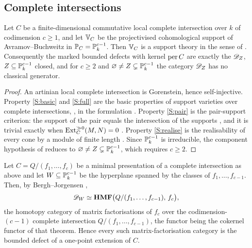 \subsection{Complete intersections}

\begin{theorem}\label{thm:ci-classification}
Let \(C\) be a finite-dimensional commutative local complete intersection over \(k\) of codimension \(c\ge1\), and let \(\mathbb V_C\) be the projectivised cohomological support of Avramov--Buchweitz \cite{AvramovBuchweitz00} in \(\mathbb P_C=\mathbb P^{c-1}_k\).  Then \(\mathbb V_C\) is a support theory in the sense of .  Consequently the marked bounded defects with kernel \(\operatorname{per} C\) are exactly the \(\mathscr D_Z\), \(Z\subseteq\mathbb P^{c-1}_k\) closed, and for \(c\ge2\) and \(\varnothing\ne Z\subsetneq\mathbb P^{c-1}_k\) the category \(\mathscr D_Z\) has no classical generator.
\end{theorem}

\begin{proof}
An artinian local complete intersection is Gorenstein, hence self-injective.  Property \ref{S:basic} and \ref{S:full} are the basic properties of support varieties over complete intersections, \cite[Theorem~5.6]{AvramovBuchweitz00}, in the formulation \cite[Theorem~2.2]{BerghJorgensenEasy}.  Property \ref{S:pair} is the pair-support criterion: the support of the pair equals the intersection of the supports \cite[Theorem~2.2(3)]{BerghJorgensenEasy}, and it is trivial exactly when \(\operatorname{Ext}^{\gg0}_C(M,N)=0\) \cite[Theorem~5.6]{AvramovBuchweitz00}.  Property \ref{S:realise} is the realisability of every cone by a module of finite length \cite[Theorem~4.2 and the following Remark]{BerghJorgensenEasy}.  Since \(\mathbb P^{c-1}_k\) is irreducible, the component hypothesis of  reduces to \(\varnothing\ne Z\subsetneq\mathbb P^{c-1}_k\), which requires \(c\ge2\).
\end{proof}

\begin{proposition}\label{prop:hmf}
Let \(C=Q/(f_1,\dots,f_c)\) be a minimal presentation of a complete intersection as above and let \(W\subseteq\mathbb P^{c-1}_k\) be the hyperplane spanned by the classes of \(f_1,\dots,f_{c-1}\).  Then, by Bergh--Jorgensen \cite[Theorem~3.5]{BerghJorgensenMF},
\begin{equation}\label{eq:hmf}
 \mathscr D_W\simeq\operatorname{\mathbf{HMF}}\bigl(Q/(f_1,\dots,f_{c-1}),\,f_c\bigr),
\end{equation}
the homotopy category of matrix factorisations of \(f_c\) over the codimension-\((c-1)\) complete intersection \(Q/(f_1,\dots,f_{c-1})\), the functor being the cokernel functor of that theorem.  Hence every such matrix-factorisation category is the bounded defect of a one-point extension of \(C\).
\end{proposition}

